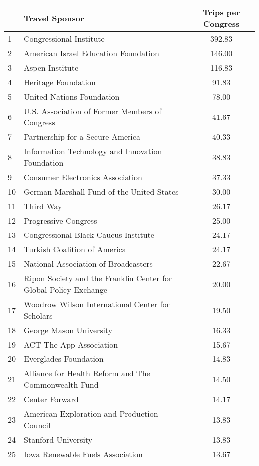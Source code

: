 \documentclass[12pt]{article}
\begin{document}
\begin{table}[ht]
\centering
\begin{tabular}{llc}
  \hline
 & Travel Sponsor & Trips per Congress \\
  \hline
1 & Congressional Institute & 392.83 \\
  2 & American Israel Education Foundation & 146.00 \\
  3 & Aspen Institute & 116.83 \\
  4 & Heritage Foundation & 91.83 \\
  5 & United Nations Foundation & 78.00 \\
  6 & U.S. Association of Former Members of Congress & 41.67 \\
  7 & Partnership for a Secure America & 40.33 \\
  8 & Information Technology and Innovation Foundation & 38.83 \\
  9 & Consumer Electronics Association & 37.33 \\
  10 & German Marshall Fund of the United States & 30.00 \\
  11 & Third Way & 26.17 \\
  12 & Progressive Congress & 25.00 \\
  13 & Congressional Black Caucus Institute & 24.17 \\
  14 & Turkish Coalition of America & 24.17 \\
  15 & National Association of Broadcasters & 22.67 \\
  16 & Ripon Society and the Franklin Center for Global Policy Exchange & 20.00 \\
  17 & Woodrow Wilson International Center for Scholars & 19.50 \\
  18 & George Mason University & 16.33 \\
  19 & ACT The App Association & 15.67 \\
  20 & Everglades Foundation & 14.83 \\
  21 & Alliance for Health Reform and The Commonwealth Fund & 14.50 \\
  22 & Center Forward & 14.17 \\
  23 & American Exploration and Production Council & 13.83 \\
  24 & Stanford University & 13.83 \\
  25 & Iowa Renewable Fuels Association & 13.67 \\
   \hline
\end{tabular}
\end{table}
\end{document}

